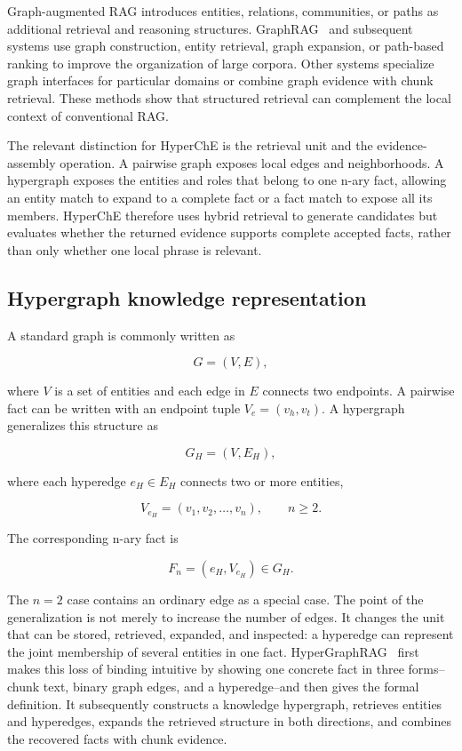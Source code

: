 Graph-augmented RAG introduces entities, relations, communities, or paths as additional retrieval and reasoning structures. GraphRAG~\citep{GraphRAG} and subsequent systems use graph construction, entity retrieval, graph expansion, or path-based ranking to improve the organization of large corpora. Other systems specialize graph interfaces for particular domains or combine graph evidence with chunk retrieval. These methods show that structured retrieval can complement the local context of conventional RAG.

The relevant distinction for HyperChE is the retrieval unit and the evidence-assembly operation. A pairwise graph exposes local edges and neighborhoods. A hypergraph exposes the entities and roles that belong to one n-ary fact, allowing an entity match to expand to a complete fact or a fact match to expose all its members. HyperChE therefore uses hybrid retrieval to generate candidates but evaluates whether the returned evidence supports complete accepted facts, rather than only whether one local phrase is relevant.

\subsection{Hypergraph knowledge representation}

A standard graph is commonly written as

\[
G=(V,E),
\]

where $V$ is a set of entities and each edge in $E$ connects two endpoints. A pairwise fact can be written with an endpoint tuple $V_e=(v_h,v_t)$. A hypergraph generalizes this structure as

\[
G_H=(V,E_H),
\]

where each hyperedge $e_H\in E_H$ connects two or more entities,

\[
V_{e_H}=(v_1,v_2,\ldots,v_n),\qquad n\geq 2.
\]

The corresponding n-ary fact is

\[
F_n=(e_H,V_{e_H})\in G_H.
\]

The $n=2$ case contains an ordinary edge as a special case. The point of the generalization is not merely to increase the number of edges. It changes the unit that can be stored, retrieved, expanded, and inspected: a hyperedge can represent the joint membership of several entities in one fact. HyperGraphRAG~\citep{HyperGraphRAG} first makes this loss of binding intuitive by showing one concrete fact in three forms--chunk text, binary graph edges, and a hyperedge--and then gives the formal definition. It subsequently constructs a knowledge hypergraph, retrieves entities and hyperedges, expands the retrieved structure in both directions, and combines the recovered facts with chunk evidence.

